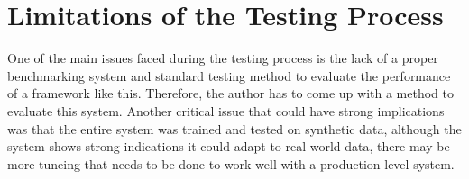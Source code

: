 \section{Limitations of the Testing Process}

One of the main issues faced during the testing process is the lack of a proper benchmarking system and standard testing method to evaluate the performance of a framework like this. Therefore, the author has to come up with a method to evaluate this system. Another critical issue that could have strong implications was that the entire system was trained and tested on synthetic data, although the system shows strong indications it could adapt to real-world data, there may be more tuneing that needs to be done to work well with a production-level system.